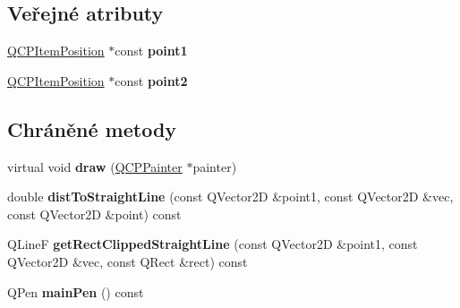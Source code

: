\subsection*{Veřejné atributy}
\begin{DoxyCompactItemize}
\item 
\hypertarget{classQCPItemStraightLine_ac131a6ffe456f2cc7364dce541fe0120}{}\hyperlink{classQCPItemPosition}{Q\+C\+P\+Item\+Position} $\ast$const {\bfseries point1}\label{classQCPItemStraightLine_ac131a6ffe456f2cc7364dce541fe0120}

\item 
\hypertarget{classQCPItemStraightLine_ad26c0a732e471f63f75d481dcd48cfc9}{}\hyperlink{classQCPItemPosition}{Q\+C\+P\+Item\+Position} $\ast$const {\bfseries point2}\label{classQCPItemStraightLine_ad26c0a732e471f63f75d481dcd48cfc9}

\end{DoxyCompactItemize}
\subsection*{Chráněné metody}
\begin{DoxyCompactItemize}
\item 
\hypertarget{classQCPItemStraightLine_a2daa1e1253216c26565d56a2d5530170}{}virtual void {\bfseries draw} (\hyperlink{classQCPPainter}{Q\+C\+P\+Painter} $\ast$painter)\label{classQCPItemStraightLine_a2daa1e1253216c26565d56a2d5530170}

\item 
\hypertarget{classQCPItemStraightLine_adc9b6c5bd33c7f806b748b79dfa25926}{}double {\bfseries dist\+To\+Straight\+Line} (const Q\+Vector2\+D \&point1, const Q\+Vector2\+D \&vec, const Q\+Vector2\+D \&point) const \label{classQCPItemStraightLine_adc9b6c5bd33c7f806b748b79dfa25926}

\item 
\hypertarget{classQCPItemStraightLine_af18ac29577b5b96fece15b0ffea70177}{}Q\+Line\+F {\bfseries get\+Rect\+Clipped\+Straight\+Line} (const Q\+Vector2\+D \&point1, const Q\+Vector2\+D \&vec, const Q\+Rect \&rect) const \label{classQCPItemStraightLine_af18ac29577b5b96fece15b0ffea70177}

\item 
\hypertarget{classQCPItemStraightLine_a63ef39814c5b560dbb7b13e3fec1d940}{}Q\+Pen {\bfseries main\+Pen} () const \label{classQCPItemStraightLine_a63ef39814c5b560dbb7b13e3fec1d940}

\end{DoxyCompactItemize}
